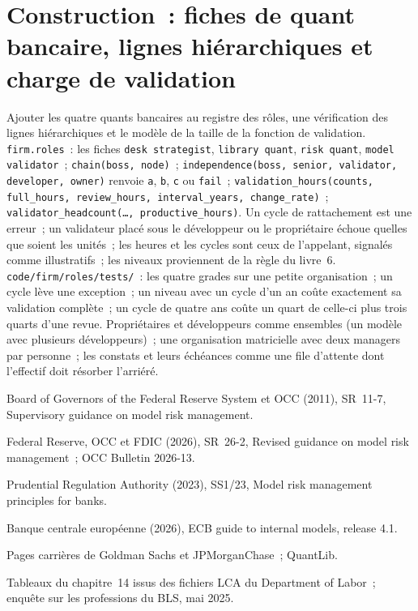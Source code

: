 \section{Construction~: fiches de quant bancaire, lignes hiérarchiques et charge de validation}\label{bld:in:bank-quant:roles}

\begin{build}
 Ajouter les quatre quants bancaires au registre des rôles, une vérification des lignes hiérarchiques et le modèle de la
taille de la fonction de validation.
 \texttt{firm.roles}~: les fiches \texttt{desk strategist}, \texttt{library quant}, \texttt{risk quant},
\texttt{model validator}~; \texttt{chain(boss, node)}~; \texttt{independence(boss, senior, validator, developer, owner)}
renvoie \texttt{a}, \texttt{b}, \texttt{c} ou \texttt{fail}~;
\texttt{validation\_hours(counts, full\_hours, review\_hours, interval\_years, change\_rate)}~; \texttt{validator\_headcount(\dots, productive\_hours)}.
 Un cycle de rattachement est une erreur~; un validateur placé sous le développeur ou le propriétaire échoue quelles que soient les unités~; les heures
et les cycles sont ceux de l'appelant, signalés comme illustratifs~; les niveaux proviennent de la règle du livre~6.
 \texttt{code/firm/roles/tests/}~: les quatre grades sur une petite organisation~; un cycle lève une exception~; un
niveau avec un cycle d'un an coûte exactement sa validation complète~; un cycle de quatre ans coûte un quart de celle-ci plus trois quarts
d'une revue.
 Propriétaires et développeurs comme ensembles (un modèle avec plusieurs développeurs)~; une organisation matricielle avec deux managers
par personne~; les constats et leurs échéances comme une file d'attente dont l'effectif doit résorber l'arriéré.
\end{build}

\begin{omsources}
\item Board of Governors of the Federal Reserve System et OCC (2011), SR~11-7, Supervisory guidance on model risk
management.
\item Federal Reserve, OCC et FDIC (2026), SR~26-2, Revised guidance on model risk management~; OCC Bulletin 2026-13.
\item Prudential Regulation Authority (2023), SS1/23, Model risk management principles for banks.
\item Banque centrale européenne (2026), ECB guide to internal models, release 4.1.
\item Pages carrières de Goldman Sachs et JPMorganChase~; QuantLib.
\item Tableaux du chapitre~14 issus des fichiers LCA du Department of Labor~; enquête sur les professions du BLS, mai 2025.
\end{omsources}

